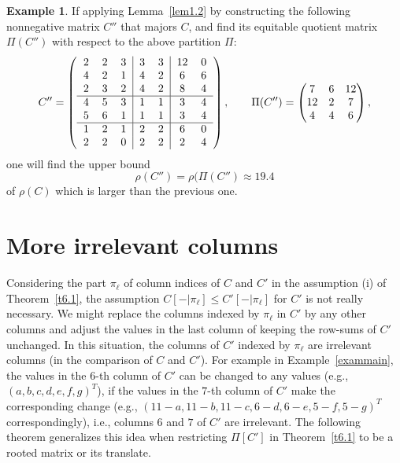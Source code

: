 \documentclass[final,3p, times, 12pt]{elsarticle}
\theoremstyle{plain}
\theoremstyle{definition}
\newtheorem{exam}[thm]{Example}
\theoremstyle{remark}
\numberwithin{equation}{section}
\begin{document}
\begin{exam}
If applying Lemma~\ref{lem1.2} by constructing the following nonnegative matrix $C''$ that majors $C$, and find its equitable quotient matrix $\Pi(C'')$ with respect to the above partition $\Pi$:
$$C''=\left(
\begin{tabular}{ccc|cc|cc} 2 & 2 & 3 & 3 & 3 & 12 & 0\\ 4 & 2 & 1 & 4 & 2 & 6 & 6\\ 2 & 3 & 2 & 4 & 2 & 8 &4 \\
\hline
4 & 5 & 3 & 1 & 1& 3 & 4\\ 5 & 6 & 1 & 1 & 1 & 3 &4\\
\hline
 1& 2 & 1 & 2 & 2 & 6 & 0\\  2 & 2 & 0 & 2 &2& 2 &4\end{tabular}\right), \qquad \Pi(C'')=\begin{pmatrix} 7 & 6 & 12 \\ 12 & 2& 7\\ 4& 4 & 6\end{pmatrix},$$
 one will find the upper bound
$$\rho(C'')=\rho (\Pi(C'')\approx 19.4$$
of $\rho(C)$ which is larger than the previous one.
\end{exam}



\section{More irrelevant columns}

Considering the part $\pi_\ell$ of column indices of $C$ and $C'$ in the assumption (i) of Theorem~\ref{t6.1},
the assumption $C[-|\pi_\ell]\leq C'[-|\pi_\ell]$ for $C'$ is not really necessary. We might replace the columns indexed by
$\pi_\ell$ in $C'$ by any other columns and adjust the values in the last column of keeping the row-sums of $C'$ unchanged.
In this situation, the columns of $C'$ indexed by $\pi_\ell$ are irrelevant columns (in the comparison of $C$ and $C'$).
For example in Example~\ref{exammain},
the values in the  $6$-th column of $C'$ can be changed to any values (e.g., $(a, b, c, d, e, f, g)^T$), if the values in the $7$-th column of $C'$ make the corresponding change (e.g., $(11-a, 11-b, 11-c, 6-d, 6-e, 5-f, 5-g)^T$ correspondingly), i.e., columns $6$ and $7$ of $C'$ are irrelevant.  The following theorem generalizes this idea when restricting $\Pi[C']$ in Theorem~\ref{t6.1} to be a rooted matrix or its translate.
\end{document}
